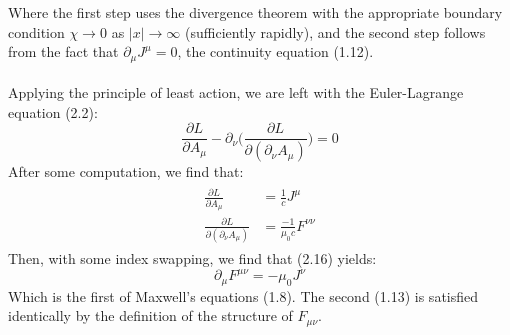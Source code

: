 \documentclass[a4paper]{article}
\numberwithin{equation}{section}
\begin{document}
Where the first step uses the divergence theorem with the appropriate boundary condition $\chi \rightarrow 0$ as $|x|\rightarrow \infty$ (sufficiently rapidly), and the second step follows from the fact that $\partial_\mu J^\mu =0$, the continuity equation (1.12).\\
\\
Applying the principle of least action, we are left with the Euler-Lagrange equation (2.2):
\begin{equation}
\frac{\partial L}{\partial A_\mu} - \partial_\nu \bigg(\frac{\partial L}{\partial (\partial_\nu A_\mu)} \bigg)=0
\end{equation}
After some computation, we find that:
\begin{align}
\begin{split}
\frac{\partial L}{\partial A_\mu} & = \frac{1}{c}J^\mu \\
\frac{\partial L}{\partial(\partial_\nu A_\mu)}&=\frac{-1}{\mu_0 c}F^{\nu \nu}
\end{split}
\end{align}
Then, with some index swapping, we find that (2.16) yields:
\begin{equation}
\partial_\mu F^{\mu \nu}=-\mu_0 J^\nu
\end{equation}
Which is the first of Maxwell's equations (1.8). The second (1.13) is satisfied identically by the definition of the structure of $F_{\mu \nu}$.
\end{document}
